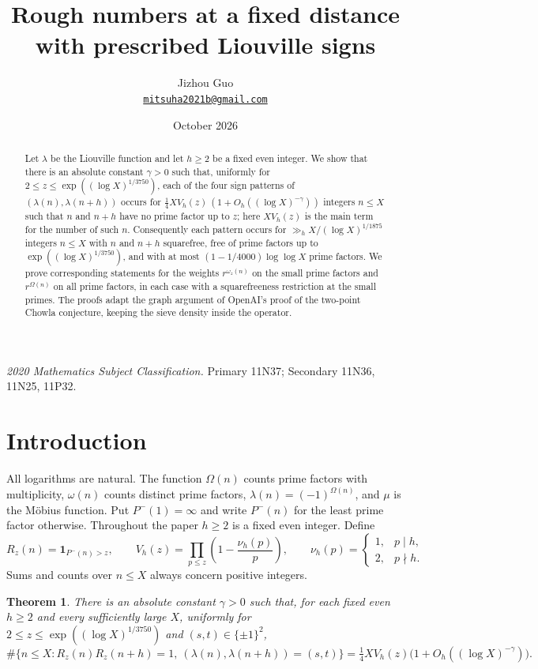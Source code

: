 \documentclass[11pt]{article}
\title{Rough numbers at a fixed distance with prescribed Liouville signs}
\author{Jizhou Guo\\
  \href{mailto:mitsuha2021b@gmail.com}{\texttt{mitsuha2021b@gmail.com}}}
\date{October 2026}
\newtheorem{theorem}{Theorem}[section]
\theoremstyle{definition}
\newcommand{\ind}{\mathbf 1}
\theoremstyle{remark}
\numberwithin{equation}{section}
\begin{document}
\maketitle
\begin{abstract}
Let $\lambda$ be the Liouville function and let $h\ge2$ be a fixed even integer. We show that there is an absolute
constant $\gamma>0$ such that, uniformly for $2\le z\le\exp((\log X)^{1/3750})$, each of the four sign patterns of
$(\lambda(n),\lambda(n+h))$ occurs for $\tfrac14XV_h(z)\,(1+O_h((\log X)^{-\gamma}))$ integers $n\le X$ such that
$n$ and $n+h$ have no prime factor up to $z$; here $XV_h(z)$ is the main term for the number of such $n$.
Consequently each pattern occurs for $\gg_hX/(\log X)^{1/1875}$ integers $n\le X$ with $n$ and $n+h$ squarefree,
free of prime factors up to $\exp((\log X)^{1/3750})$, and with at most $(1-1/4000)\log\log X$ prime factors. We
prove corresponding statements for the weights $r^{\omega_z(n)}$ on the small prime factors and
$r^{\Omega(n)}$ on all prime factors, in each case with a squarefreeness restriction at the small primes. The proofs adapt the graph argument of OpenAI's proof of the two-point Chowla
conjecture, keeping the sieve density inside the operator.
\end{abstract}
\noindent\textit{2020 Mathematics Subject Classification.} Primary 11N37; Secondary 11N36, 11N25, 11P32.

\section{Introduction}\label{sec:intro}
All logarithms are natural. The function $\Omega(n)$ counts prime factors with multiplicity, $\omega(n)$ counts
distinct prime factors, $\lambda(n)=(-1)^{\Omega(n)}$, and $\mu$ is the M\"obius function. Put $P^-(1)=\infty$ and write $P^-(n)$ for the least
prime factor otherwise. Throughout the paper $h\ge2$ is a fixed even integer. Define
\begin{equation}\label{eq:rough-def}
 R_z(n)=\ind_{P^-(n)>z},\qquad
 V_h(z)=\prod_{p\le z}\left(1-\frac{\nu_h(p)}p\right),\qquad
 \nu_h(p)=\begin{cases}1,&p\mid h,\\2,&p\nmid h.\end{cases}
\end{equation}
Sums and counts over $n\le X$ always concern positive integers.

\begin{theorem}\label{thm:rough}
There is an absolute constant $\gamma>0$ such that, for each fixed even $h\ge2$ and every sufficiently large $X$,
uniformly for $2\le z\le\exp((\log X)^{1/3750})$ and $(s,t)\in\{\pm1\}^2$,
\begin{equation}\label{eq:rough-main}
\#\{n\le X:R_z(n)R_z(n+h)=1,\ (\lambda(n),\lambda(n+h))=(s,t)\}
 =\tfrac14XV_h(z)\bigl(1+O_h((\log X)^{-\gamma})\bigr).
\end{equation}
\end{theorem}
\end{document}
